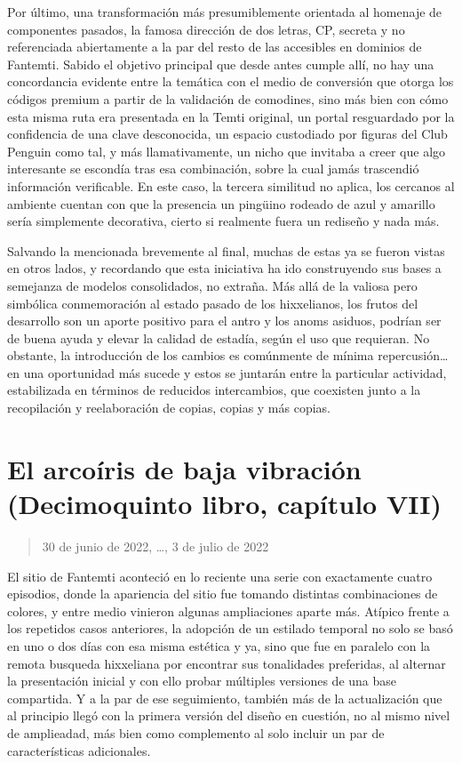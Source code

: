 \documentclass[
]{book}
\begin{document}
Por último, una transformación más presumiblemente orientada al homenaje de componentes pasados, la famosa dirección de dos letras, CP, secreta y no referenciada abiertamente a la par del resto de las accesibles en dominios de Fantemti. Sabido el objetivo principal que desde antes cumple allí, no hay una concordancia evidente entre la temática con el medio de conversión que otorga los códigos premium a partir de la validación de comodines, sino más bien con cómo esta misma ruta era presentada en la Temti original, un portal resguardado por la confidencia de una clave desconocida, un espacio custodiado por figuras del Club Penguin como tal, y más llamativamente, un nicho que invitaba a creer que algo interesante se escondía tras esa combinación, sobre la cual jamás trascendió información verificable. En este caso, la tercera similitud no aplica, los cercanos al ambiente cuentan con que la presencia un pingüino rodeado de azul y amarillo sería simplemente decorativa, cierto si realmente fuera un rediseño y nada más.

Salvando la mencionada brevemente al final, muchas de estas ya se fueron vistas en otros lados, y recordando que esta iniciativa ha ido construyendo sus bases a semejanza de modelos consolidados, no extraña. Más allá de la valiosa pero simbólica conmemoración al estado pasado de los hixxelianos, los frutos del desarrollo son un aporte positivo para el antro y los anoms asiduos, podrían ser de buena ayuda y elevar la calidad de estadía, según el uso que requieran. No obstante, la introducción de los cambios es comúnmente de mínima repercusión\ldots{} en una oportunidad más sucede y estos se juntarán entre la particular actividad, estabilizada en términos de reducidos intercambios, que coexisten junto a la recopilación y reelaboración de copias, copias y más copias.

\hypertarget{el-arcouxedris-de-baja-vibraciuxf3n-decimoquinto-libro-capuxedtulo-vii}{%
\section{El arcoíris de baja vibración (Decimoquinto libro, capítulo VII)}\label{el-arcouxedris-de-baja-vibraciuxf3n-decimoquinto-libro-capuxedtulo-vii}}

\begin{quote}
30 de junio de 2022, \ldots, 3 de julio de 2022
\end{quote}

El sitio de Fantemti aconteció en lo reciente una serie con exactamente cuatro episodios, donde la apariencia del sitio fue tomando distintas combinaciones de colores, y entre medio vinieron algunas ampliaciones aparte más. Atípico frente a los repetidos casos anteriores, la adopción de un estilado temporal no solo se basó en uno o dos días con esa misma estética y ya, sino que fue en paralelo con la remota busqueda hixxeliana por encontrar sus tonalidades preferidas, al alternar la presentación inicial y con ello probar múltiples versiones de una base compartida. Y a la par de ese seguimiento, también más de la actualización que al principio llegó con la primera versión del diseño en cuestión, no al mismo nivel de amplieadad, más bien como complemento al solo incluir un par de características adicionales.
\end{document}
